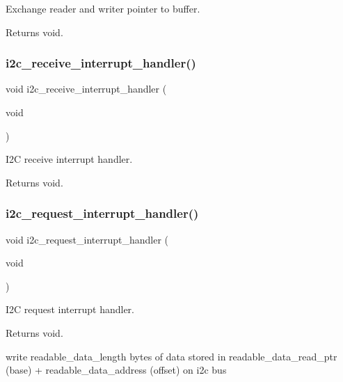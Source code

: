 Exchange reader and writer pointer to buffer. 

\begin{DoxyReturn}{Returns}
void. 
\end{DoxyReturn}
\mbox{\label{i2c-rain_8h_a7f81fcf39717baf18f2e7c2eee2051ae}} 
\subsubsection{\texorpdfstring{i2c\+\_\+receive\+\_\+interrupt\+\_\+handler()}{i2c\_receive\_interrupt\_handler()}}
{\footnotesize\ttfamily void i2c\+\_\+receive\+\_\+interrupt\+\_\+handler (\begin{DoxyParamCaption}\item[{void}]{ }\end{DoxyParamCaption})}



I2C receive interrupt handler. 

\begin{DoxyReturn}{Returns}
void. 
\end{DoxyReturn}
\mbox{\label{i2c-rain_8h_ac1da31566bf05976ecb87372278a1ea8}} 
\subsubsection{\texorpdfstring{i2c\+\_\+request\+\_\+interrupt\+\_\+handler()}{i2c\_request\_interrupt\_handler()}}
{\footnotesize\ttfamily void i2c\+\_\+request\+\_\+interrupt\+\_\+handler (\begin{DoxyParamCaption}\item[{void}]{ }\end{DoxyParamCaption})}



I2C request interrupt handler. 

\begin{DoxyReturn}{Returns}
void. 
\end{DoxyReturn}
write readable\+\_\+data\+\_\+length bytes of data stored in readable\+\_\+data\+\_\+read\+\_\+ptr (base) + readable\+\_\+data\+\_\+address (offset) on i2c bus \mbox{\label{i2c-rain_8h_ad438327c9cf783bd9c519ce8b8ef3bfa}} 
